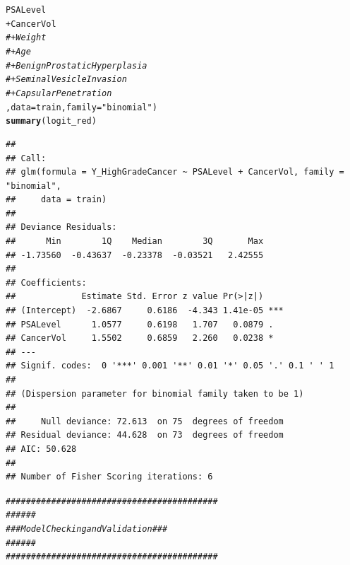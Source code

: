 \documentclass{article}\usepackage[]{graphicx}\usepackage[]{color}
\makeatletter
\newcommand{\hlstr}[1]{\textcolor[rgb]{0.192,0.494,0.8}{#1}}%
\newcommand{\hlcom}[1]{\textcolor[rgb]{0.678,0.584,0.686}{\textit{#1}}}%
\newcommand{\hlopt}[1]{\textcolor[rgb]{0,0,0}{#1}}%
\newcommand{\hlstd}[1]{\textcolor[rgb]{0.345,0.345,0.345}{#1}}%
\newcommand{\hlkwc}[1]{\textcolor[rgb]{0.333,0.667,0.333}{#1}}%
\newcommand{\hlkwd}[1]{\textcolor[rgb]{0.737,0.353,0.396}{\textbf{#1}}}%
\newenvironment{kframe}{%
 \def\at@end@of@kframe{}%
 \ifinner\ifhmode%
  \def\at@end@of@kframe{\end{minipage}}%
  \begin{minipage}{\columnwidth}%
 \fi\fi%
 \def\FrameCommand##1{\hskip\@totalleftmargin \hskip-\fboxsep
 \colorbox{shadecolor}{##1}\hskip-\fboxsep
     \hskip-\linewidth \hskip-\@totalleftmargin \hskip\columnwidth}%
 \MakeFramed {\advance\hsize-\width
   \@totalleftmargin\z@ \linewidth\hsize
   \@setminipage}}%
 {\par\unskip\endMakeFramed%
 \at@end@of@kframe}
\newenvironment{knitrout}{}{} %
\makeatother
\begin{document}
\begin{knitrout}
\begin{kframe}
\begin{alltt}
                   \hlstd{PSALevel}
                 \hlopt{+} \hlstd{CancerVol}
                 \hlcom{# + Weight }
                 \hlcom{# + Age}
                 \hlcom{# + BenignProstaticHyperplasia}
                 \hlcom{# + SeminalVesicleInvasion}
                 \hlcom{# + CapsularPenetration}
                 \hlstd{,} \hlkwc{data}\hlstd{=train,} \hlkwc{family}\hlstd{=}\hlstr{"binomial"}\hlstd{)}
\hlkwd{summary}\hlstd{(logit_red)}
\end{alltt}
\begin{verbatim}
## 
## Call:
## glm(formula = Y_HighGradeCancer ~ PSALevel + CancerVol, family = "binomial", 
##     data = train)
## 
## Deviance Residuals: 
##      Min        1Q    Median        3Q       Max  
## -1.73560  -0.43637  -0.23378  -0.03521   2.42555  
## 
## Coefficients:
##             Estimate Std. Error z value Pr(>|z|)    
## (Intercept)  -2.6867     0.6186  -4.343 1.41e-05 ***
## PSALevel      1.0577     0.6198   1.707   0.0879 .  
## CancerVol     1.5502     0.6859   2.260   0.0238 *  
## ---
## Signif. codes:  0 '***' 0.001 '**' 0.01 '*' 0.05 '.' 0.1 ' ' 1
## 
## (Dispersion parameter for binomial family taken to be 1)
## 
##     Null deviance: 72.613  on 75  degrees of freedom
## Residual deviance: 44.628  on 73  degrees of freedom
## AIC: 50.628
## 
## Number of Fisher Scoring iterations: 6
\end{verbatim}
\begin{alltt}
\hlcom{##########################################}
\hlcom{###                                    ###}
\hlcom{###    Model Checking and Validation   ###}
\hlcom{###                                    ###}
\hlcom{##########################################}


\end{alltt}
\end{kframe}
\end{knitrout}
\end{document}
